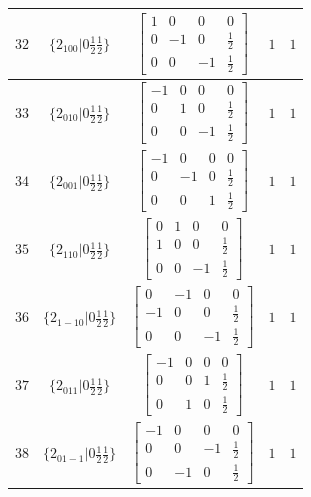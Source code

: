 \documentclass[fleqn,8pt]{jsarticle}
\begin{document}
\begin{longtable}{ccccc}
$ 32 $ & $ \{2{}_{100}|0 \frac{1}{2} \frac{1}{2}\} $ & $ \begin{bmatrix} 1 & 0 & 0 & 0 \\ 0 & -1 & 0 & \frac{1}{2} \\ 0 & 0 & -1 & \frac{1}{2} \end{bmatrix} $ & $ 1 $ & $ 1 $ \\ \hline
$ 33 $ & $ \{2{}_{010}|0 \frac{1}{2} \frac{1}{2}\} $ & $ \begin{bmatrix} -1 & 0 & 0 & 0 \\ 0 & 1 & 0 & \frac{1}{2} \\ 0 & 0 & -1 & \frac{1}{2} \end{bmatrix} $ & $ 1 $ & $ 1 $ \\ \hline
$ 34 $ & $ \{2{}_{001}|0 \frac{1}{2} \frac{1}{2}\} $ & $ \begin{bmatrix} -1 & 0 & 0 & 0 \\ 0 & -1 & 0 & \frac{1}{2} \\ 0 & 0 & 1 & \frac{1}{2} \end{bmatrix} $ & $ 1 $ & $ 1 $ \\ \hline
$ 35 $ & $ \{2{}_{110}|0 \frac{1}{2} \frac{1}{2}\} $ & $ \begin{bmatrix} 0 & 1 & 0 & 0 \\ 1 & 0 & 0 & \frac{1}{2} \\ 0 & 0 & -1 & \frac{1}{2} \end{bmatrix} $ & $ 1 $ & $ 1 $ \\ \hline
$ 36 $ & $ \{2{}_{1-10}|0 \frac{1}{2} \frac{1}{2}\} $ & $ \begin{bmatrix} 0 & -1 & 0 & 0 \\ -1 & 0 & 0 & \frac{1}{2} \\ 0 & 0 & -1 & \frac{1}{2} \end{bmatrix} $ & $ 1 $ & $ 1 $ \\ \hline
$ 37 $ & $ \{2{}_{011}|0 \frac{1}{2} \frac{1}{2}\} $ & $ \begin{bmatrix} -1 & 0 & 0 & 0 \\ 0 & 0 & 1 & \frac{1}{2} \\ 0 & 1 & 0 & \frac{1}{2} \end{bmatrix} $ & $ 1 $ & $ 1 $ \\ \hline
$ 38 $ & $ \{2{}_{01-1}|0 \frac{1}{2} \frac{1}{2}\} $ & $ \begin{bmatrix} -1 & 0 & 0 & 0 \\ 0 & 0 & -1 & \frac{1}{2} \\ 0 & -1 & 0 & \frac{1}{2} \end{bmatrix} $ & $ 1 $ & $ 1 $ \\ \hline

\end{longtable}
\end{document}
